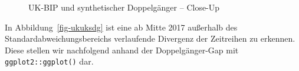 \documentclass[
  a4paper,
  DIV=11,
  oneside]{scrreprt}
\begin{document}
\begin{figure}[t]


\caption{\label{fig-ukuksdgclose}UK-BIP und synthetischer Doppelgänger
-- Close-Up}

\end{figure}%

In Abbildung~\ref{fig-ukuksdg} ist eine ab Mitte 2017 außerhalb des
Standardabweichungsbereichs verlaufende Divergenz der Zeitreihen zu
erkennen. Diese stellen wir nachfolgend anhand der Doppelgänger-Gap mit
\texttt{ggplot2::ggplot()} dar.
\end{document}
